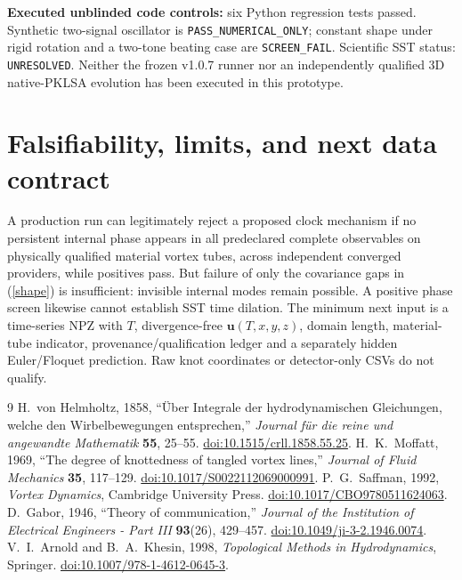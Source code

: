 \documentclass[11pt,a4paper]{article}
\begin{document}
\noindent\textbf{Executed unblinded code controls:} six Python regression tests passed. Synthetic two-signal oscillator is \texttt{PASS\_NUMERICAL\_ONLY}; constant shape under rigid rotation and a two-tone beating case are \texttt{SCREEN\_FAIL}. Scientific SST status: \texttt{UNRESOLVED}. Neither the frozen v1.0.7 runner nor an independently qualified 3D native-PKLSA evolution has been executed in this prototype.

\section{Falsifiability, limits, and next data contract}
A production run can legitimately reject a proposed clock mechanism if no persistent internal phase appears in all predeclared complete observables on physically qualified material vortex tubes, across independent converged providers, while positives pass. But failure of only the covariance gaps in (\ref{shape}) is insufficient: invisible internal modes remain possible. A positive phase screen likewise cannot establish SST time dilation. The minimum next input is a time-series NPZ with $T$, divergence-free $\mathbf u(T,x,y,z)$, domain length, material-tube indicator, provenance/qualification ledger and a separately hidden Euler/Floquet prediction. Raw knot coordinates or detector-only CSVs do not qualify.

\begin{thebibliography}{9}
 H.~von Helmholtz, 1858, ``\"Uber Integrale der hydrodynamischen Gleichungen, welche den Wirbelbewegungen entsprechen,'' \emph{Journal f\"ur die reine und angewandte Mathematik} \textbf{55}, 25--55. \href{https://doi.org/10.1515/crll.1858.55.25}{doi:10.1515/crll.1858.55.25}.
 H.~K.~Moffatt, 1969, ``The degree of knottedness of tangled vortex lines,'' \emph{Journal of Fluid Mechanics} \textbf{35}, 117--129. \href{https://doi.org/10.1017/S0022112069000991}{doi:10.1017/S0022112069000991}.
 P.~G.~Saffman, 1992, \emph{Vortex Dynamics}, Cambridge University Press. \href{https://doi.org/10.1017/CBO9780511624063}{doi:10.1017/CBO9780511624063}.
 D.~Gabor, 1946, ``Theory of communication,'' \emph{Journal of the Institution of Electrical Engineers - Part III} \textbf{93}(26), 429--457. \href{https://doi.org/10.1049/ji-3-2.1946.0074}{doi:10.1049/ji-3-2.1946.0074}.
 V.~I.~Arnold and B.~A.~Khesin, 1998, \emph{Topological Methods in Hydrodynamics}, Springer. \href{https://doi.org/10.1007/978-1-4612-0645-3}{doi:10.1007/978-1-4612-0645-3}.
\end{thebibliography}
\end{document}
